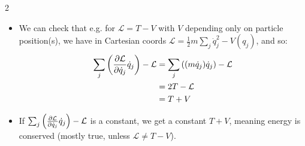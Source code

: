 \documentclass[10pt, portrait]{article}
\begin{document}
\begin{multicols*}{2}
\begin{itemize}
\[\begin{aligned}
        &= -\pdv{\mathcal{L}}{t} \text{ (by E-L eqns)}
    \end{aligned}
    \]
    \item We can check that e.g. for $\mathcal{L} = T - V$ with $V$ depending only on particle position(s), we have in Cartesian coords $\mathcal{L} = \frac{1}{2}m\sum_j\dot{q}_j^2 - V(q_j)$, and so:
    \[
    \begin{aligned}
        \sum_j\left(\pdv{\mathcal{L}}{\dot{q}_j}\dot{q}_j\right) - \mathcal{L} &= \sum_j \left((m\dot{q}_j)\dot{q}_j\right) - \mathcal{L} \\
        &= 2T - \mathcal{L} \\
        &= T + V
    \end{aligned}
    \]
    \item If $\sum_j\left(\pdv{\mathcal{L}}{\dot{q}_j}\dot{q}_j\right) - \mathcal{L}$ is a constant, we get a constant $T + V$, meaning energy is conserved (mostly true, unless $\mathcal{L} \neq T - V$).  
\end{itemize}



\end{multicols*}
\end{document}
